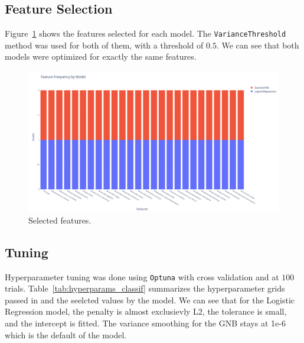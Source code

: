 \documentclass[12pt]{article}
\begin{document}
\subsection{Feature Selection}

Figure~\ref{fig:classif_features} shows the features selected for each model.
The \texttt{VarianceThreshold} method was used for both of them, with a threshold of
$0.5$. We can see that both models were optimized for exactly the same features.

\begin{figure}[H]
    \centering
    \includegraphics[width=\textwidth]{ims/selected_features_classif.png}
    \caption{Selected features.}
    \label{fig:classif_features}
\end{figure}


\subsection{Tuning}

Hyperparameter tuning was done using \texttt{Optuna} with cross validation and at
$100$ trials. Table~\ref{tab:hyperparams_classif} summarizes the hyperparameter
grids passed in and the seelcted values by the model. We can see that for the 
Logistic Regression model, the penalty is almost exclusievly L2, the tolerance is
small, and the intercept is fitted. The variance smoothing for the GNB stays at
1e-6 which is the default of the model.
\end{document}
